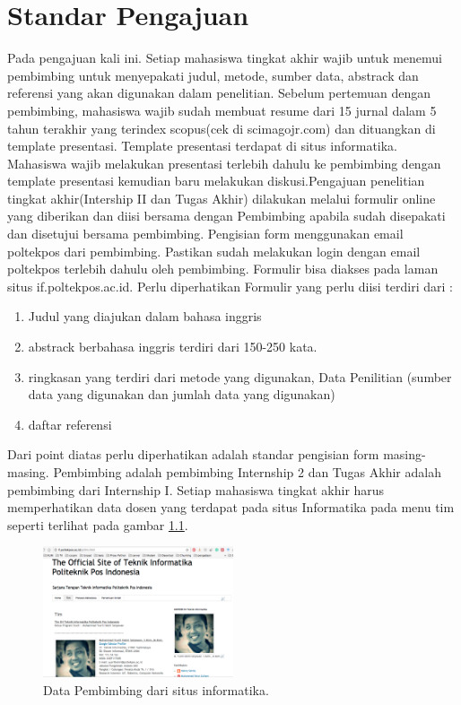 \chapter{Standar Pengajuan}

Pada pengajuan kali ini. Setiap mahasiswa tingkat akhir wajib untuk menemui pembimbing untuk menyepakati judul, metode, sumber data, abstrack dan referensi yang akan digunakan dalam penelitian. Sebelum pertemuan dengan pembimbing, mahasiswa wajib sudah membuat resume dari 15 jurnal dalam 5 tahun terakhir yang terindex scopus(cek di scimagojr.com) dan dituangkan di template presentasi. Template presentasi terdapat di situs informatika. Mahasiswa wajib melakukan presentasi terlebih dahulu ke pembimbing dengan template presentasi kemudian baru melakukan diskusi.Pengajuan penelitian tingkat akhir(Intership II dan Tugas Akhir) dilakukan melalui formulir online yang diberikan dan diisi bersama dengan Pembimbing apabila sudah disepakati dan disetujui bersama pembimbing. Pengisian form menggunakan email poltekpos dari pembimbing. Pastikan sudah melakukan login dengan email poltekpos terlebih dahulu oleh pembimbing. Formulir bisa diakses pada laman situs if.poltekpos.ac.id. Perlu diperhatikan Formulir yang perlu diisi terdiri dari :
\begin{enumerate}
\item Judul yang diajukan dalam bahasa inggris
\item abstrack berbahasa inggris terdiri dari 150-250 kata.
\item ringkasan yang terdiri dari metode yang digunakan, Data Penilitian (sumber data yang digunakan dan jumlah data yang digunakan)
\item daftar referensi
\end{enumerate}
Dari point diatas perlu diperhatikan adalah standar pengisian form masing-masing. Pembimbing adalah pembimbing Internship 2 dan Tugas Akhir adalah pembimbing dari Internship I. Setiap mahasiswa tingkat akhir harus memperhatikan data dosen yang terdapat pada situs Informatika pada menu tim seperti terlihat pada gambar \ref{figure:timif}.
\begin{figure}[ht]
	\centerline{\includegraphics[width=0.5\textwidth]{figures/timif.png}}
	\caption{Data Pembimbing dari situs informatika.}
	\label{figure:timif}
	\end{figure}
